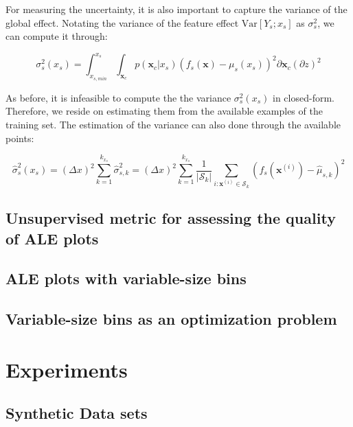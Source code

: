 \documentclass[wcp]{jmlr}
\newcommand{\xc}{\mathbf{x}_c}
\newcommand{\x}{\mathbf{x}}
\newcommand{\xii}{\mathbf{x}^{(i)}}
\newcommand{\var}{\mathrm{Var}}
\newcommand{\1}{\mathbbm{1}}
\begin{document}
For measuring the uncertainty, it is also important to capture the
variance of the global effect. Notating the variance of the feature
effect \(\var[Y_s ; x_s]\) as \(\sigma_s^2\), we can compute it
through:

\begin{equation}
  \sigma_s^2 (x_s)
  = \int_{x_{s,min}}^{x_s} \int_{\xc} p(\xc|x_s) (f_s(\x) - \mu_s(x_s))^2 \partial \xc (\partial z)^2
\end{equation}

As before, it is infeasible to compute the the variance
\(\sigma_s^2(x_s)\) in closed-form. Therefore, we reside on estimating
them from the available examples of the training set. The estimation
of the variance can also done through the available points:

\begin{equation}
  \label{eq:effect-var-approx}
  \hat{\sigma}_s^2(x_s)
  = (\Delta x)^2 \sum_{k=1}^{k_{x_s}} \hat{\sigma}_{s,k}^2
  = (\Delta x)^2 \sum_{k=1}^{k_{x_s}} \frac{1}{|\mathcal{S}_k|} \sum_{i:\xii \in \mathcal{S}_k} (f_s(\xii) - \hat{\mu}_{s,k})^2 
\end{equation}

\subsection{Unsupervised metric for assessing the quality of ALE plots}

\subsection{ALE plots with variable-size bins}

\subsection{Variable-size bins as an optimization problem}

\section{Experiments}

\subsection{Synthetic Data sets}
\end{document}
